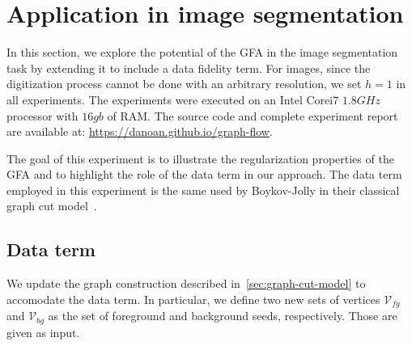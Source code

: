 \documentclass[review]{siamart220329}
\begin{document}



\section{Application in image segmentation}
In this section, we explore the potential of the GFA in the image segmentation
task by extending it to include a data fidelity term. For images,
since the digitization process cannot be done with an arbitrary resolution, we
set $h=1$ in all experiments. The experiments were executed on an Intel Corei7
$1.8GHz$ processor with $16gb$ of RAM. The source code and complete experiment
report are available at: \url{https://danoan.github.io/graph-flow}.

The goal of this experiment is to illustrate the regularization properties of
the GFA and to highlight the role of the data term in our approach. The data
term employed in this experiment is the same used by Boykov-Jolly in their
classical graph cut model~\cite{boykov01graphcut}.

\subsection{Data term}
We update the graph construction described in~\cref{sec:graph-cut-model} to
accomodate the data term. In particular, we define two new sets of vertices
$\mathcal{V}_{fg}$ and $\mathcal{V}_{bg}$ as the set of foreground and
background seeds, respectively. Those are given as input.
\end{document}
